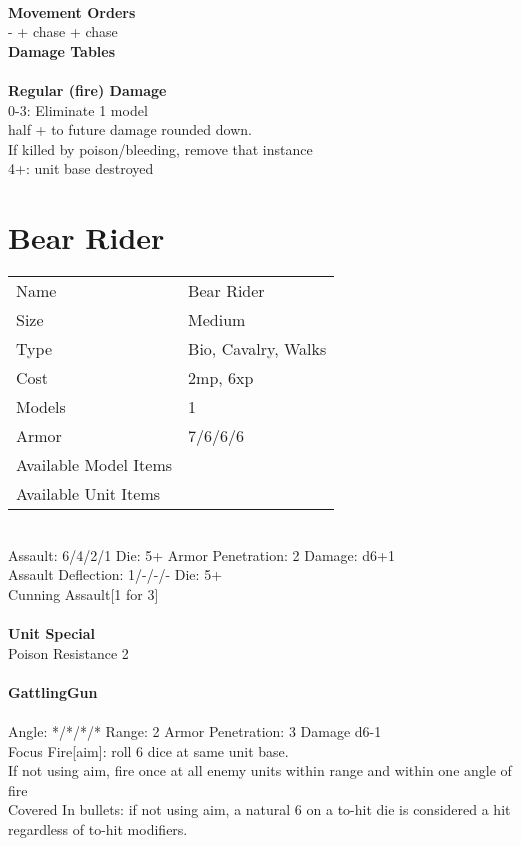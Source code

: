 \ \\ {\bf Movement Orders } \\
- + chase + chase \\



{\bf Damage Tables} \\
\ \\ {\bf Regular (fire) Damage } \\
0-3: Eliminate 1 model\\ half + to future damage rounded down. \\ If killed by poison/bleeding, remove that instance \\
4+: unit base destroyed \\









\pagebreak

\section{ Bear Rider }

\begin{tabular}{ll}
  Name & Bear Rider \\
  Size & Medium\\
  Type & Bio, Cavalry, Walks\\
  Cost & 2mp, 6xp\\
  Models & 1\\
  Armor & 7/6/6/6\\
  Available Model Items &  \\
  Available Unit Items &  \\
\end{tabular}

\ \\
Assault: 6/4/2/1 Die: 5+ Armor Penetration: 2 Damage: d6+1 \\
Assault Deflection: 1/-/-/- Die: 5+\\
\indent Cunning Assault[1 for 3] \\
\ \\

{\bf Unit Special} \\
Poison Resistance 2
\ \\
\ \\
{\bf GattlingGun } \\
\ \\
Angle: */*/*/* Range: 2 Armor Penetration: 3 Damage d6-1 \\
\indent Focus Fire[aim]: roll 6 dice at same unit base. \\ If not using aim, fire once at all enemy units within range and within one angle of fire \\ Covered In bullets: if not using aim, a natural 6 on a to-hit die is considered a hit regardless of to-hit modifiers. \\





